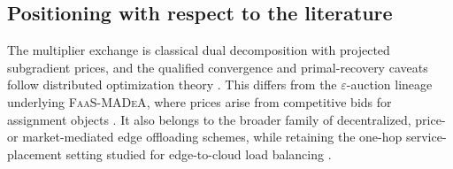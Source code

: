 \subsection{Positioning with respect to the literature}
The multiplier exchange is classical dual decomposition with projected
subgradient prices, and the qualified convergence and primal-recovery caveats
follow distributed optimization theory \citep{bertsekas1989,nedic2009}.
This differs from the $\varepsilon$-auction lineage underlying
\textsc{FaaS-MADeA}, where prices arise from competitive bids for assignment
objects \citep{bertsekas1988}. It also belongs to the broader family of
decentralized, price- or market-mediated edge offloading schemes, while retaining
the one-hop service-placement setting studied for edge-to-cloud load balancing
\citep{nezami2021}.
